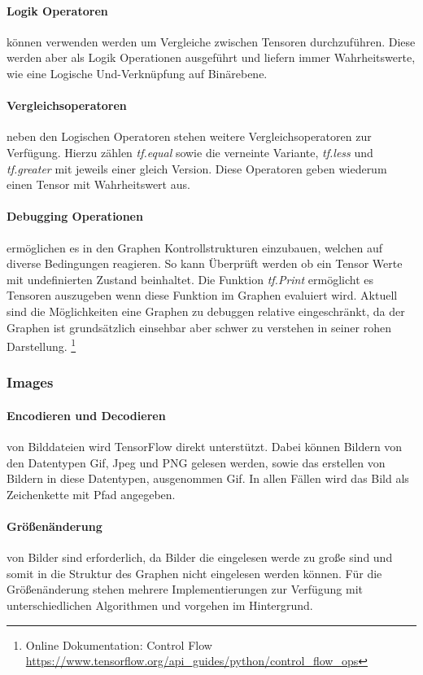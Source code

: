 \paragraph{Logik Operatoren} können verwenden werden um Vergleiche zwischen Tensoren durchzuführen. 
Diese werden aber als Logik Operationen ausgeführt und liefern immer Wahrheitswerte, wie eine Logische Und-Verknüpfung auf Binärebene.

\paragraph{Vergleichsoperatoren} neben den Logischen Operatoren stehen weitere Vergleichsoperatoren zur Verfügung. 
Hierzu zählen \textit{tf.equal} sowie die verneinte Variante, \textit{tf.less} und \textit{tf.greater} mit jeweils einer gleich Version. 
Diese Operatoren geben wiederum einen Tensor mit Wahrheitswert aus.

\paragraph{Debugging Operationen} ermöglichen es in den Graphen Kontrollstrukturen einzubauen, welchen auf diverse Bedingungen reagieren.
So kann Überprüft werden ob ein Tensor Werte mit undefinierten Zustand beinhaltet. 
Die Funktion \textit{tf.Print} ermöglicht es Tensoren auszugeben wenn diese Funktion im Graphen evaluiert wird. 
Aktuell sind die Möglichkeiten eine Graphen zu debuggen relative eingeschränkt, da der Graphen ist grundsätzlich einsehbar aber schwer zu verstehen in seiner rohen Darstellung.
\footnote{Online Dokumentation: Control Flow \url{https://www.tensorflow.org/api_guides/python/control_flow_ops}}

\subsubsection{Images}

\paragraph{Encodieren und Decodieren} von Bilddateien wird TensorFlow direkt unterstützt.
Dabei können Bildern von den Datentypen Gif, Jpeg und PNG gelesen werden, sowie das erstellen von Bildern in diese Datentypen, ausgenommen Gif. 
In allen Fällen wird das Bild als Zeichenkette mit Pfad angegeben. 

\paragraph{Größenänderung} von Bilder sind erforderlich, da Bilder die eingelesen werde zu große sind und somit in die Struktur des Graphen nicht eingelesen werden können. 
Für die Größenänderung stehen mehrere Implementierungen zur Verfügung mit unterschiedlichen Algorithmen und vorgehen im Hintergrund.

